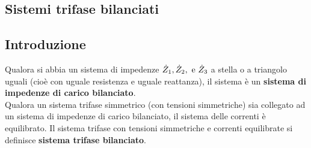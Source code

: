 \documentclass{article}
\begin{document}
\subsection{Sistemi trifase bilanciati}
\subsection{Introduzione}
Qualora si abbia un sistema di impedenze $\dot Z_1, \dot Z_2, \text{ e } \dot Z_3$ a stella o a
triangolo uguali (cioè con uguale resistenza e uguale reattanza), il sistema è un \textbf{sistema di impedenze di carico bilanciato}.\\
Qualora un sistema trifase simmetrico (con tensioni simmetriche) sia collegato ad un sistema di impedenze di carico bilanciato, il sistema
delle correnti è equilibrato. Il sistema trifase con tensioni simmetriche e correnti equilibrate si definisce \textbf{sistema trifase bilanciato}.
\end{document}
